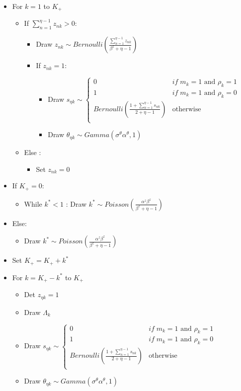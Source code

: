 \documentclass[12pt]{article}
\begin{document}
\begin{itemize}
	\item For $k=1$ to $K_+$
	\begin{itemize}
		\item If $\sum_{n=1}^{\eta-1} z_{nk} > 0 $:
		\begin{itemize}
			\item Draw $z_{nk} \sim Bernoulli(\frac{\sum_{n=1}^{\eta-1} z_{nk}}{\beta^z + \eta - 1})$
			\item If $z_{nk} = 1$: 
			\begin{itemize}
				\item Draw $s_{\eta k} \sim \left\{ \begin{array}{cl}
				0 & if \; m_k=1 \text{ and } \rho_k=1\\
				1 & if \; m_k=1 \text{ and } \rho_k=0\\
				Bernoulli(\frac{1 + \sum_{n=1}^{\eta-1} s_{nk}}{2+\eta-1}) & \text{otherwise}\\
				\end{array}\right.$
				\item Draw $\theta_{\eta k} \sim Gamma(\sigma^\theta \alpha^\theta,1)$
			\end{itemize}
		\end{itemize}
		\item Else :
		\begin{itemize}
			\item Set $z_{nk}=0$
		\end{itemize}
	\end{itemize}
	\item If $K_+=0$:
	\begin{itemize}
		\item While $k^* < 1$ : Draw $k^* \sim Poisson(\frac{\alpha^z \beta^z}{\beta^z + \eta - 1})$
	\end{itemize}
	\item Else:
	\begin{itemize}
		\item Draw $k^* \sim Poisson(\frac{\alpha^z \beta^z}{\beta^z + \eta - 1})$
	\end{itemize}
	\item Set $K_+ = K_+ + k^*$
	\item For $k=K_+ - k^*$ to $K_+$
	\begin{itemize}
		\item Det $z_{\eta k} = 1$
		\item Draw $\Lambda_k$
		\item Draw $s_{\eta k} \sim \left\{ \begin{array}{cl}
		0 & if \; m_k=1 \text{ and } \rho_k=1\\
		1 & if \; m_k=1 \text{ and } \rho_k=0\\
		Bernoulli(\frac{1 + \sum_{n=1}^{\eta-1} s_{nk}}{2+\eta-1}) & \text{otherwise}\\
		\end{array}\right.$
		\item Draw $\theta_{\eta k} \sim Gamma(\sigma^\theta \alpha^\theta,1)$
	\end{itemize}
\end{itemize} 
\end{document}
